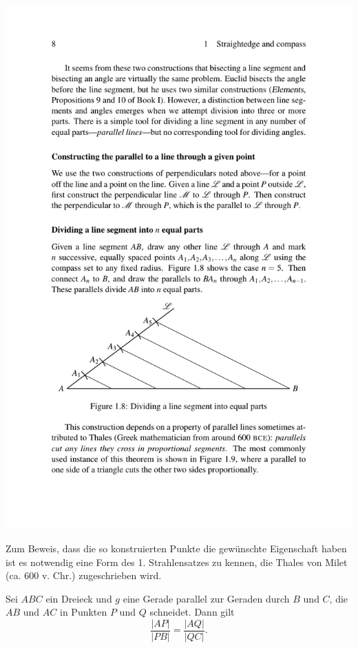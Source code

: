 \centerline{\includegraphics[width=14cm]{BILDER/BildKonstruktionNTeilungStrecke.pdf}}




Zum Beweis, dass die so konstruierten Punkte die gewünschte Eigenschaft
haben ist es notwendig eine Form des 1. Strahlensatzes zu kennen, die 
Thales von Milet (ca. 600 v. Chr.) zugeschrieben wird.

\begin{thm}[Strahlensatz]  \label{thm:strahlensatz}
Sei $ABC$ ein Dreieck und $g$ eine Gerade parallel zur Geraden durch
$B$ und $C$, die $AB$ und $AC$ in Punkten $P$ und $Q$ schneidet.
Dann gilt
$$
\frac{|AP|}{|PB|}
= 
\frac{|AQ|}{|QC|}
.
$$
\end{thm}


